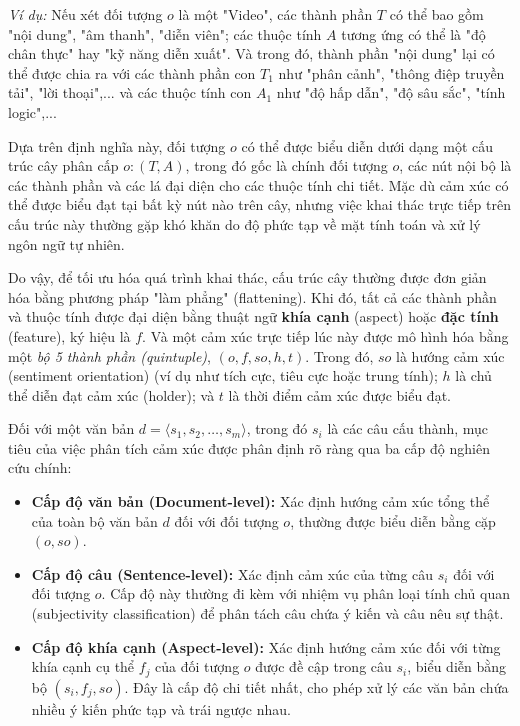 \documentclass{article}[12pt]
\begin{document}
{    \textit{Ví dụ:} Nếu xét đối tượng $o$ là một "Video", các thành phần $T$ có thể bao gồm "nội dung", "âm thanh", "diễn viên"; các thuộc tính $A$ tương ứng có thể là "độ chân thực" hay "kỹ năng diễn xuất". Và trong đó, thành phần "nội dung" lại có thể được chia ra với các thành phần con $T_1$ như "phân cảnh", "thông điệp truyền tải", "lời thoại",... và các thuộc tính con $A_1$ như "độ hấp dẫn", "độ sâu sắc", "tính logic",...
    
    Dựa trên định nghĩa này, đối tượng $o$ có thể được biểu diễn dưới dạng một cấu trúc cây phân cấp $o: (T, A)$, trong đó gốc là chính đối tượng $o$, các nút nội bộ là các thành phần và các lá đại diện cho các thuộc tính chi tiết. Mặc dù cảm xúc có thể được biểu đạt tại bất kỳ nút nào trên cây, nhưng việc khai thác trực tiếp trên cấu trúc này thường gặp khó khăn do độ phức tạp về mặt tính toán và xử lý ngôn ngữ tự nhiên.
    
    Do vậy, để tối ưu hóa quá trình khai thác, cấu trúc cây thường được đơn giản hóa bằng phương pháp "làm phẳng" (flattening). Khi đó, tất cả các thành phần và thuộc tính được đại diện bằng thuật ngữ \textbf{khía cạnh} (aspect) hoặc \textbf{đặc tính} (feature), ký hiệu là $f$. Và một cảm xúc trực tiếp lúc này được mô hình hóa bằng một \textit{bộ 5 thành phần (quintuple)}, $(o, f, so, h, t)$. Trong đó, $so$ là hướng cảm xúc (sentiment orientation) (ví dụ như tích cực, tiêu cực hoặc trung tính); $h$ là chủ thể diễn đạt cảm xúc (holder); và $t$ là thời điểm cảm xúc được biểu đạt.
    
    Đối với một văn bản $d = \langle s_1, s_2, \dots, s_m \rangle$, trong đó $s_i$ là các câu cấu thành, mục tiêu của việc phân tích cảm xúc được phân định rõ ràng qua ba cấp độ nghiên cứu chính:
    \begin{itemize}
        \item \textbf{Cấp độ văn bản (Document-level):} Xác định hướng cảm xúc tổng thể của toàn bộ văn bản $d$ đối với đối tượng $o$, thường được biểu diễn bằng cặp $(o, so)$.
        \item \textbf{Cấp độ câu (Sentence-level):} Xác định cảm xúc của từng câu $s_i$ đối với đối tượng $o$. Cấp độ này thường đi kèm với nhiệm vụ phân loại tính chủ quan (subjectivity classification) để phân tách câu chứa ý kiến và câu nêu sự thật.
        \item \textbf{Cấp độ khía cạnh (Aspect-level):} Xác định hướng cảm xúc đối với từng khía cạnh cụ thể $f_j$ của đối tượng $o$ được đề cập trong câu $s_i$, biểu diễn bằng bộ $(s_i, f_j, so)$. Đây là cấp độ chi tiết nhất, cho phép xử lý các văn bản chứa nhiều ý kiến phức tạp và trái ngược nhau.
    \end{itemize}

}
\end{document}
